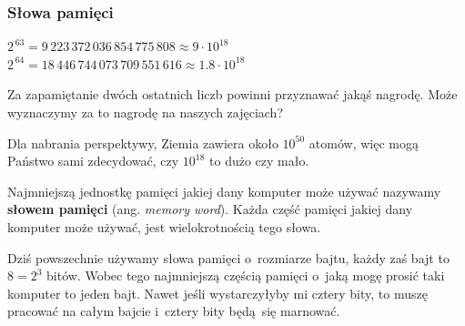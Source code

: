 \documentclass[10pt,t]{beamer}
\begin{document}
\begin{frame}
  \frametitle{Słowa pamięci}


  $2^{ \, 63 } = 9 \, 223 \, 372 \, 036 \, 854 \, 775 \, 808
  \approx 9 \cdot 10^{ 18 }$ \\
  $2^{ \, 64 } = 18 \, 446 \, 744 \, 073 \, 709 \, 551 \, 616
  \approx 1.8 \cdot 10^{ 18 }$

  Za zapamiętanie dwóch ostatnich liczb powinni przyznawać jakąś nagrodę.
  Może wyznaczymy za to nagrodę na naszych zajęciach?

  Dla nabrania perspektywy, Ziemia zawiera około $10^{ 50 }$ atomów, więc
  mogą Państwo sami zdecydować, czy $10^{ 18 }$ to dużo czy mało.

  Najmniejszą jednostkę pamięci jakiej dany komputer może używać nazywamy
  \textbf{słowem pamięci} (ang. \textit{memory word}). Każda część pamięci
  jakiej dany komputer może używać, jest wielokrotnością tego słowa.

  Dziś powszechnie używamy słowa pamięci o~rozmiarze bajtu, każdy
  zaś bajt to $8 = 2^{ 3 }$ bitów. Wobec tego najmniejszą częścią pamięci
  o~jaką mogę prosić taki komputer to jeden bajt. Nawet jeśli wystarczyłyby
  mi cztery bity, to muszę pracować na całym bajcie i~cztery bity będą~się
  marnować.

\end{frame}
\end{document}
